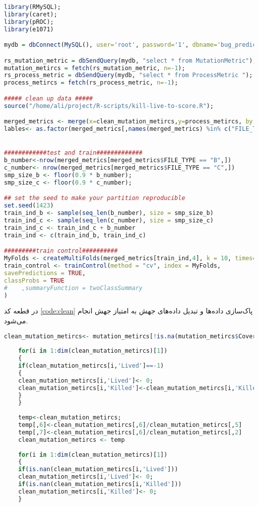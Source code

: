 \begin{latin}
	\begin{lstlisting}[language=R]
library(RMySQL);
library(caret);
library(pROC);
library(e1071)

mydb = dbConnect(MySQL(), user='root', password='1', dbname='bug_predict', host='127.0.0.1');

rs_mutation_metric = dbSendQuery(mydb, "select * from MutationMetric");
mutation_metircs = fetch(rs_mutation_metric, n=-1);
rs_process_metric = dbSendQuery(mydb, "select * from ProcessMetric ");
process_metircs = fetch(rs_process_metric, n=-1);

##### clean up data #####
source("/home/ali/project/R-scripts/kill-live-to-score.R");

merged_metrics <- merge(x=clean_mutation_metircs,y=process_metircs, by.x="MetricId", by.y="ID")
lables<- as.factor(merged_metrics[,names(merged_metrics) %in% c("FILE_TYPE")]);


############test and train#############
b_number<-nrow(merged_metrics[merged_metrics$FILE_TYPE == "B",])
c_number<- nrow(merged_metrics[merged_metrics$FILE_TYPE == "C",])
smp_size_b <- floor(0.9 * b_number);
smp_size_c <- floor(0.9 * c_number);

## set the seed to make your partition reproducible
set.seed(1423)
train_ind_b <- sample(seq_len(b_number), size = smp_size_b)
train_ind_c <- sample(seq_len(c_number), size = smp_size_c)
train_ind_c <- train_ind_c + b_number
train_ind <- c(train_ind_b, train_ind_c)

#########train control##########
MyFolds <- createMultiFolds(merged_metrics[train_ind,4], k = 10, times=10)
train_control <- trainControl(method = "cv", index = MyFolds,
savePredictions = TRUE,
classProbs = TRUE
#    ,summaryFunction = twoClassSummary
)

	\end{lstlisting}
\end{latin}
\label{code:data-set}
در قطعه کد \ref{code:clean} پاک‌سازی داده‌ها و تبدیل داده‌های جهش به امتیاز جهش انجام می‌شود.
\begin{latin}
	\begin{lstlisting}[language=R]
	clean_mutation_metircs<- mutation_metircs[!is.na(mutation_metircs$Covered),];
	
	for(i in 1:dim(clean_mutation_metircs)[1])
	{
	if(clean_mutation_metircs[i,'Lived']==-1)
	{
	clean_mutation_metircs[i,'Lived']<- 0;
	clean_mutation_metircs[i,'Killed']<-clean_mutation_metircs[i,'Killed']-1;
	}
	}
	
	temp<-clean_mutation_metircs;
	temp[,6]<-clean_mutation_metircs[,6]/clean_mutation_metircs[,5]
	temp[,7]<-clean_mutation_metircs[,6]/clean_mutation_metircs[,2]
	clean_mutation_metircs <- temp
	
	for(i in 1:dim(clean_mutation_metircs)[1])
	{
	if(is.nan(clean_mutation_metircs[i,'Lived']))
	clean_mutation_metircs[i,'Lived']<- 0;
	if(is.nan(clean_mutation_metircs[i,'Killed']))
	clean_mutation_metircs[i,'Killed']<- 0;
	}
	\end{lstlisting}
\end{latin}
